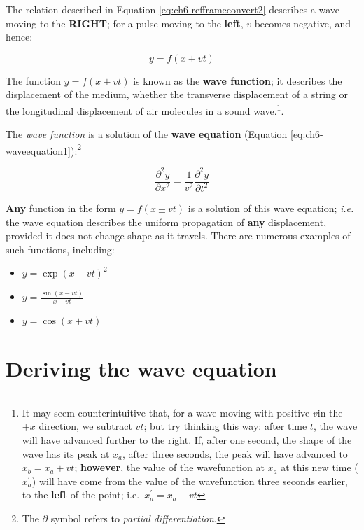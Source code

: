 \documentclass[
]{book}
\providecommand{\tightlist}{%
  \setlength{\itemsep}{0pt}\setlength{\parskip}{0pt}}
\begin{document}
The relation described in Equation \eqref{eq:ch6-refframeconvert2} describes a wave moving to the \textbf{RIGHT}; for a pulse moving to the \textbf{left}, \(v\) becomes negative, and hence:

\begin{equation}
y = f(x + vt)
\end{equation}

The function \(y = f(x \pm vt)\) is known as the \textbf{wave function}; it describes the displacement of the medium, whether the transverse displacement of a string or the longitudinal displacement of air molecules in a sound wave.\footnote{It may seem counterintuitive that, for a wave moving with positive \(v\)in the \(+x\) direction, we subtract \(vt\); but try thinking this way: after time \(t\), the wave will have advanced further to the right. If, after one second, the shape of the wave has its peak at \(x_a\), after three seconds, the peak will have advanced to \(x_b = x_a + vt\); \textbf{however}, the value of the wavefunction at \(x_a\) at this new time (\(x_a^\prime\)) will have come from the value of the wavefunction three seconds earlier, to the \textbf{left} of the point; i.e.~\(x_a^\prime = x_a - vt\)}.

The \emph{wave function} is a solution of the \textbf{wave equation} (Equation \eqref{eq:ch6-waveequation1}):\footnote{The \(\partial\) symbol refers to \emph{partial differentiation}.}

\begin{equation}
\frac{\partial^2 y}{\partial x^2} = \frac{1}{v^2} \frac{\partial^2 y}{\partial t^2}
\label{eq:ch6-waveequation1}
\end{equation}

\textbf{Any} function in the form \(y = f(x \pm vt)\) is a solution of this wave equation; \emph{i.e.} the wave equation describes the uniform propagation of \textbf{any} displacement, provided it does not change shape as it travels. There are numerous examples of such functions, including:

\begin{itemize}
\tightlist
\item
  \(y = \exp(x-vt)^2\)
\item
  \(y = \frac{\sin(x-vt)}{x-vt}\)
\item
  \(y = \cos (x+vt)\)
\end{itemize}

\hypertarget{sec:ch6-derivingwaveequation}{%
\section{Deriving the wave equation}\label{sec:ch6-derivingwaveequation}}
\end{document}

